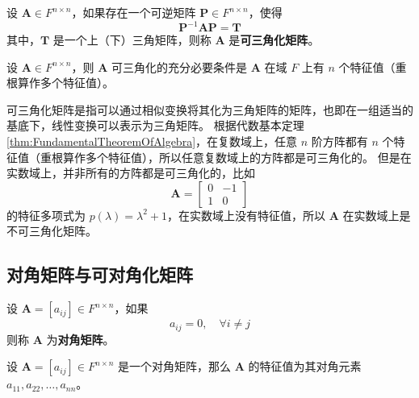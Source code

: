 \begin{definition}
    设 $\mathbf{A} \in F^{n \times n}$，如果存在一个可逆矩阵 $\mathbf{P} \in F^{n \times n}$，使得
    \[
        \mathbf{P}^{-1}\mathbf{A}\mathbf{P} = \mathbf{T}
    \]
    其中，$\mathbf{T}$ 是一个上（下）三角矩阵，则称 $\mathbf{A}$ 是\textbf{可三角化矩阵}。
    \label{def:triangularizable_matrix}
\end{definition}

\begin{proposition}[可三角化矩阵的充要条件]
    设 $\mathbf{A} \in F^{n \times n}$，则 $\mathbf{A}$ 可三角化的充分必要条件是 $\mathbf{A}$ 在域 $F$ 上有 $n$ 个特征值（重根算作多个特征值）。
    \label{prop:triangularizable_matrix_necessary_sufficient_condition}
\end{proposition}

\begin{note}
    可三角化矩阵是指可以通过相似变换将其化为三角矩阵的矩阵，也即在一组适当的基底下，线性变换可以表示为三角矩阵。
    根据代数基本定理\ref{thm:FundamentalTheoremOfAlgebra}，在复数域上，任意 $n$ 阶方阵都有 $n$ 个特征值（重根算作多个特征值），所以任意复数域上的方阵都是可三角化的。
    但是在实数域上，并非所有的方阵都是可三角化的，比如
    \[
        \mathbf{A} = \begin{bmatrix}
            0 & -1 \\
            1 & 0
        \end{bmatrix}
    \]
    的特征多项式为 $p(\lambda) = \lambda^2 + 1$，在实数域上没有特征值，所以 $\mathbf{A}$ 在实数域上是不可三角化矩阵。
\end{note}

\vspace{1em}
\subsection{对角矩阵与可对角化矩阵}

\begin{definition}
    设 $\mathbf{A} = [a_{ij}] \in F^{n \times n}$，如果
    \[
        a_{ij} = 0, \quad \forall i \neq j
    \]
    则称 $\mathbf{A}$ 为\textbf{对角矩阵}。
    \label{def:diagonal_matrix}
\end{definition}

\begin{proposition}[对角矩阵的主对角元素即为它的特征值]
    设 $\mathbf{A} = [a_{ij}] \in F^{n \times n}$ 是一个对角矩阵，那么 $\mathbf{A}$ 的特征值为其对角元素 $a_{11}, a_{22}, \ldots, a_{nn}$。
    \label{prop:diagonal_matrix_eigenvalue}
\end{proposition}

